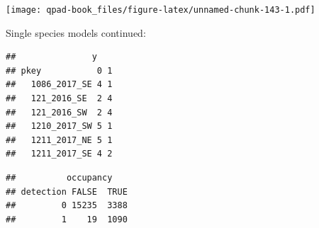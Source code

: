 \documentclass[12pt,]{book}
\newenvironment{Shaded}{\begin{snugshade}}{\end{snugshade}}
\newcommand{\CommentTok}[1]{\textcolor[rgb]{0.56,0.35,0.01}{\textit{#1}}}
\newcommand{\DataTypeTok}[1]{\textcolor[rgb]{0.13,0.29,0.53}{#1}}
\newcommand{\DecValTok}[1]{\textcolor[rgb]{0.00,0.00,0.81}{#1}}
\newcommand{\KeywordTok}[1]{\textcolor[rgb]{0.13,0.29,0.53}{\textbf{#1}}}
\newcommand{\NormalTok}[1]{#1}
\newcommand{\OperatorTok}[1]{\textcolor[rgb]{0.81,0.36,0.00}{\textbf{#1}}}
\newcommand{\StringTok}[1]{\textcolor[rgb]{0.31,0.60,0.02}{#1}}
\begin{document}
\texttt{[image: qpad-book\_files/figure-latex/unnamed-chunk-143-1.pdf]}

Single species models continued:

\begin{Shaded}
\end{Shaded}

\begin{verbatim}
##               y
## pkey           0 1
##   1086_2017_SE 4 1
##   121_2016_SE  2 4
##   121_2016_SW  2 4
##   1210_2017_SW 5 1
##   1211_2017_NE 5 1
##   1211_2017_SE 4 2
\end{verbatim}

\begin{Shaded}
\end{Shaded}

\begin{verbatim}
##          occupancy
## detection FALSE  TRUE
##         0 15235  3388
##         1    19  1090
\end{verbatim}
\end{document}
